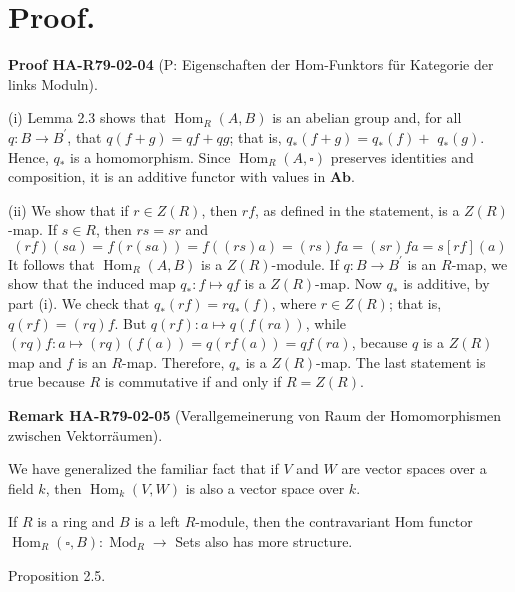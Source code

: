 \documentclass[10pt, letterpaper]{article}
\newcommand{\CustomHeading}[3]{%
  \par\medskip\noindent%
  \textbf{#1 #2} \textnormal{(#3)}.\enskip%
}
\newenvironment{REM}[2]{\begin{unitbox}\CustomHeading{Remark}{#1}{#2}}{\end{unitbox}}
\newenvironment{PROOF}[2]{\begin{unitbox}\CustomHeading{Proof}{#1}{#2}}{\end{unitbox}}
\begin{document}
\section*{Proof.}

\begin{PROOF}{HA-R79-02-04}{P: Eigenschaften der Hom-Funktors für Kategorie der links Moduln}
(i) Lemma 2.3 shows that $\operatorname{Hom}_{R}(A, B)$ is an abelian group and, for all $q: B \rightarrow B^{\prime}$, that $q(f+g)=q f+q g$; that is, $q_{*}(f+g)=q_{*}(f)+$ $q_{*}(g)$. Hence, $q_{*}$ is a homomorphism. Since $\operatorname{Hom}_{R}(A, \square)$ preserves identities and composition, it is an additive functor with values in $\mathbf{A b}$.

(ii) We show that if $r \in Z(R)$, then $r f$, as defined in the statement, is a $Z(R)$-map. If $s \in R$, then $r s=s r$ and
$$
(r f)(s a)=f(r(s a))=f((r s) a)=(r s) f a=(s r) f a=s[r f](a)
$$
It follows that $\operatorname{Hom}_{R}(A, B)$ is a $Z(R)$-module. If $q: B \rightarrow B^{\prime}$ is an $R$-map, we show that the induced map $q_{*}: f \mapsto q f$ is a $Z(R)$-map. Now $q_{*}$ is additive, by part (i). We check that $q_{*}(r f)=r q_{*}(f)$, where $r \in Z(R)$; that is, $q(r f)=(r q) f$. But $q(r f): a \mapsto q(f(r a))$, while\\
$(r q) f: a \mapsto(r q)(f(a))=q(r f(a))=q f(r a)$, because $q$ is a $Z(R)$ map and $f$ is an $R$-map. Therefore, $q_{*}$ is a $Z(R)$-map. The last statement is true because $R$ is commutative if and only if $R=Z(R)$.
\end{PROOF}



\begin{REM}{HA-R79-02-05}{Verallgemeinerung von Raum der Homomorphismen zwischen Vektorräumen}
We have generalized the familiar fact that if $V$ and $W$ are vector spaces over a field $k$, then $\operatorname{Hom}_{k}(V, W)$ is also a vector space over $k$.
\end{REM}


If $R$ is a ring and $B$ is a left $R$-module, then the contravariant Hom functor $\operatorname{Hom}_{R}(\square, B): \operatorname{Mod}_{R} \rightarrow$ Sets also has more structure.



Proposition 2.5. 
\end{document}
